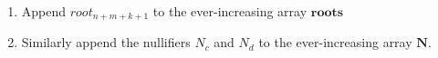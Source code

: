 \documentclass{article}
\DeclarePairedDelimiter\br{(}{)}
\begin{document}
\begin{enumerate}
\begin{align*}
{\begin{forest}
{                $}
                [{$ h\br*{
                      Z_{n-1},Z_c
                    }
                  $}
                  [{$Z_{n-1}$}][{$Z_c$}]
                ]
                [{$ h\br*{
                      ...,Z_{n+m-1}
                    }
                  $}
                  [...][{$Z_{n+m-1}$}]
                ]
              ]
            ]
            [{$ h\br*{
                  h\br*{
                    h\br*{
                      Z_d, ...
                    },
                    h\br*{
                      Z_{n+m+k-1}, Z_e
                    }
                  },
                  h\br*{
                    h\br*{
                      Z_f, 0
                    },
                    0
                  }
                }
              $}
              [{$ h\br*{
                    h\br*{
                      Z_d, ...
                    },
                    h\br*{
                      Z_{n+m+k-1}, Z_e
                    }
                  }
                $}
                [{$ h\br*{
                      Z_d, ...
                    }
                  $}
                  [{$Z_d$}][...]
                ]
                [{$ h\br*{
                      Z_{n+m+k-1}, Z_e
                    }
                  $}
                  [{$Z_{n+m+k-1}$}][{$Z_e$}]
                ]
              ]
              [{$ h\br*{
                    h\br*{
                      Z_f, 0
                    },
                    0
                  }
                $}
                [{$ h\br*{
                      Z_f, 0
                    }
                  $}
                  [{$Z_f$}][0]
                ]
                [0
                  [0][0]
                ]
              ]
            ]
          ]
        \end{forest}
      }
    \end{align*}

  \item Append $root_{n+m+k+1}$ to the ever-increasing array $\bm{roots}$
  \item Similarly append the nullifiers $N_c$ and $N_d$ to the ever-increasing array $\bm N$.
\end{enumerate}
\end{document}
